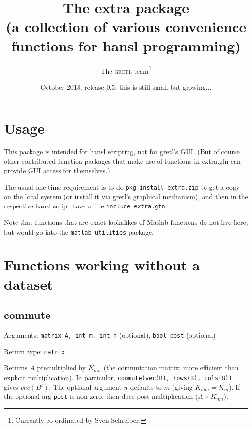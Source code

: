 \documentclass[11pt,english]{article}
\newcommand{\noun}[1]{\textsc{#1}}
\begin{document}
\title{The extra package\\
(a collection of various convenience functions for hansl programming) }

\date{October 2018, release 0.5, this is still small but growing... }

\author{The \noun{gretl} team\thanks{Currently co-ordinated by Sven Schreiber.}}

\maketitle
\tableofcontents{}

\section{Usage}

This package is intended for hansl scripting, not for gretl's GUI.
(But of course other contributed function packages that make use of
functions in extra.gfn can provide GUI access for themselves.)

The usual one-time requirement is to do \texttt{pkg install extra.zip}
to get a copy on the local system (or install it via gretl's graphical
mechanism), and then in the respective hansl script have a line \texttt{include
extra.gfn}.

Note that functions that are exact lookalikes of Matlab functions
do not live here, but would go into the \texttt{matlab\_utilities}
package.

\section{Functions working without a dataset}

\subsection{commute}

Arguments: \texttt{matrix A, int m, int n} (optional), \texttt{bool
post} (optional)

\noindent Return type: \texttt{matrix}

Returns $A$ premultiplied by $K_{mn}$ (the commutation matrix; more
efficient than explicit multiplication). In particular, \texttt{commute(vec(B),
rows(B), cols(B))} gives $vec(B')$. The optional argument $n$ defaults to
$m$ (giving $K_{mm}=K_{m}$). If the optional arg \texttt{post} is
non-zero, then does post-multiplication ($A\times K_{mn}$). 
\end{document}
